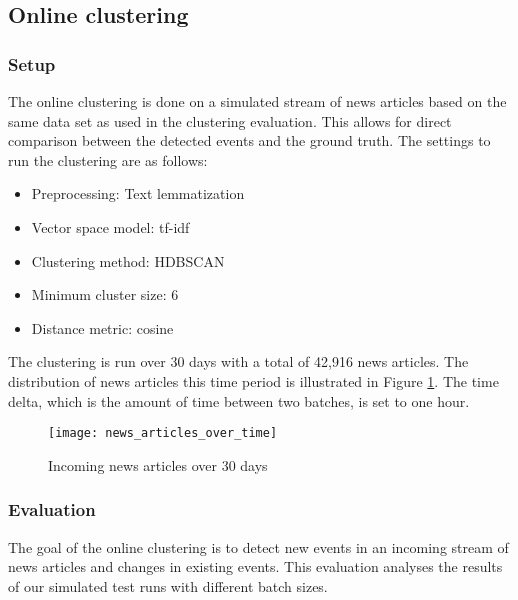 \subsection{Online clustering}
\label{sec:online_clustering}

\subsubsection{Setup}

The online clustering is done on a simulated stream of news articles
based on the same data set as used in the clustering evaluation.
This allows for direct comparison between the detected events and the ground truth.
The settings to run the clustering are as follows:

\begin{itemize}
    \item Preprocessing: Text lemmatization
    \item Vector space model: tf-idf
    \item Clustering method: HDBSCAN
    \item Minimum cluster size: 6
    \item Distance metric: cosine
\end{itemize}

The clustering is run over 30 days with a total of 42,916 news articles.
The distribution of news articles this time period is illustrated in Figure \ref{fig:news_articles_over_time}.
The time delta, which is the amount of time between two batches, is set to one hour.

\begin{figure}[h]
    \centering
    \texttt{[image: news\_articles\_over\_time]}
    \caption{Incoming news articles over 30 days}
    \label{fig:news_articles_over_time}
\end{figure}

\subsubsection{Evaluation}

The goal of the online clustering is to detect new events in an incoming stream
of news articles and changes in existing events.
This evaluation analyses the results of our simulated test runs with different batch sizes.

